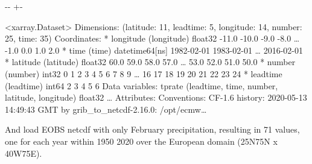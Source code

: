 \documentclass[letterpaper,10pt,english]{sphinxmanual}
\newlength\nbsphinxcodecellspacing
\begin{document}
{

\kern-\sphinxverbatimsmallskipamount\kern-\baselineskip
\kern+\FrameHeightAdjust\kern-\fboxrule
\vspace{\nbsphinxcodecellspacing}

\begin{sphinxVerbatim}[commandchars=\\\{\}]
\llap{\color{nbsphinxout}[4]:\,\hspace{\fboxrule}\hspace{\fboxsep}}<xarray.Dataset>
Dimensions:    (latitude: 11, leadtime: 5, longitude: 14, number: 25, time: 35)
Coordinates:
  * longitude  (longitude) float32 -11.0 -10.0 -9.0 -8.0 {\ldots} -1.0 0.0 1.0 2.0
  * time       (time) datetime64[ns] 1982-02-01 1983-02-01 {\ldots} 2016-02-01
  * latitude   (latitude) float32 60.0 59.0 58.0 57.0 {\ldots} 53.0 52.0 51.0 50.0
  * number     (number) int32 0 1 2 3 4 5 6 7 8 9 {\ldots} 16 17 18 19 20 21 22 23 24
  * leadtime   (leadtime) int64 2 3 4 5 6
Data variables:
    tprate     (leadtime, time, number, latitude, longitude) float32 {\ldots}
Attributes:
    Conventions:  CF-1.6
    history:      2020-05-13 14:49:43 GMT by grib\_to\_netcdf-2.16.0: /opt/ecmw{\ldots}
\end{sphinxVerbatim}
}

And load EOBS netcdf with only February precipitation, resulting in 71 values, one for each year within 1950 \sphinxhyphen{} 2020 over the European domain (25N\sphinxhyphen{}75N x 40W\sphinxhyphen{}75E).

{
\begin{sphinxVerbatim}[commandchars=\\\{\}]
\llap{\color{nbsphinxin}[5]:\,\hspace{\fboxrule}\hspace{\fboxsep}}  
\end{sphinxVerbatim}
}
\end{document}
